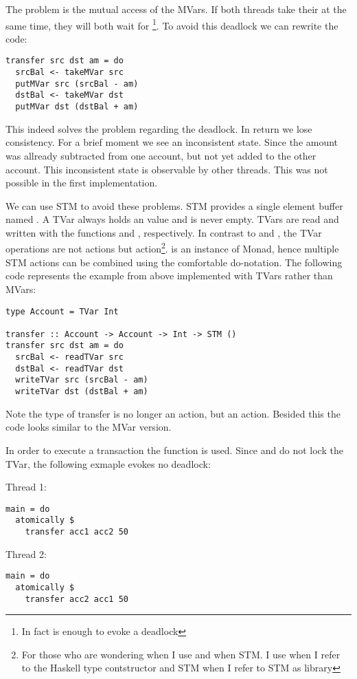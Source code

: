 The problem is the mutual access of the MVars. If both threads take their  at the same time, they will both wait for 
\footnote{In fact is  enough to evoke a deadlock}. To avoid this deadlock we can rewrite the code:
\begin{lstlisting}
transfer src dst am = do
  srcBal <- takeMVar src
  putMVar src (srcBal - am)
  dstBal <- takeMVar dst
  putMVar dst (dstBal + am)
\end{lstlisting}
This indeed solves the problem regarding the deadlock. In return we lose consistency. For a brief moment we see an inconsistent state. Since
the amount was allready subtracted from one account, but not yet added to the other account. This inconsistent state is observable by other 
threads. This was not possible in the first implementation. 

We can use STM to avoid these problems. STM provides a single element buffer named . A TVar always holds an value and is never 
empty. TVars are read and written with the functions  and , respectively. 
In contrast to  and , the TVar operations are not  actions but  action\footnote{For 
those who are wondering when I use  and when STM. I use  when I refer to the Haskell type contstructor and STM when I refer to STM as library}. 
 is an instance of Monad, hence multiple STM actions can be combined
using the comfortable do-notation. The following code represents the example from above implemented with TVars rather than MVars:
\begin{lstlisting}
type Account = TVar Int

transfer :: Account -> Account -> Int -> STM ()
transfer src dst am = do
  srcBal <- readTVar src
  dstBal <- readTVar dst
  writeTVar src (srcBal - am)
  writeTVar dst (dstBal + am)
\end{lstlisting}
Note the type of transfer is no longer an  action, but an  action. Besided this the code looks
similar to the MVar version.

In order to execute a transaction the function  is used. 
Since  and  do not lock the TVar, the following exmaple evokes no deadlock:
\par\noindent
\begin{minipage}[t]{.45\textwidth}
Thread 1:
\begin{lstlisting}[frame=lrtb]
main = do
  atomically $
    transfer acc1 acc2 50
\end{lstlisting}
\end{minipage}
\hfill
\begin{minipage}[t]{.45\textwidth}
Thread 2:
\begin{lstlisting}[frame=lrtb]
main = do 
  atomically $ 
    transfer acc2 acc1 50
\end{lstlisting}
\end{minipage}

